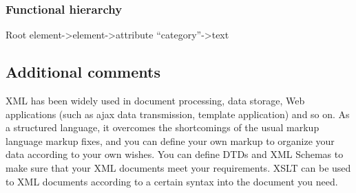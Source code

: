 
\subsubsection{Functional hierarchy}
Root element->element->attribute “category”->text


\subsection{Additional comments}
XML has been widely used in document processing, data storage, Web applications (such as ajax data transmission, template application) and so on. As a structured language, it overcomes the shortcomings of the usual markup language markup fixes, and you can define your own markup to organize your data according to your own wishes. You can define DTDs and XML Schemas to make sure that your XML documents meet your requirements. XSLT can be used to XML documents according to a certain syntax into the document you need.

